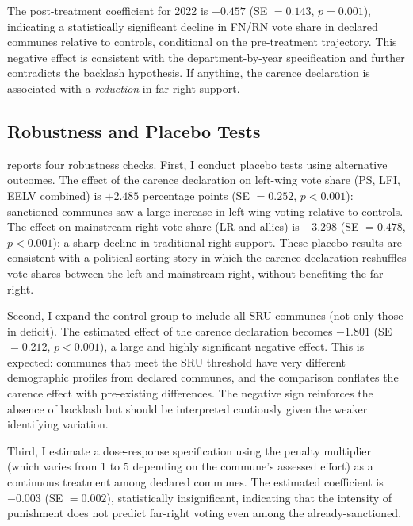 \documentclass[12pt]{article}
\begin{document}
The post-treatment coefficient for 2022 is $-0.457$ (SE $= 0.143$, $p = 0.001$), indicating a statistically significant decline in FN/RN vote share in declared communes relative to controls, conditional on the pre-treatment trajectory. This negative effect is consistent with the department-by-year specification and further contradicts the backlash hypothesis. If anything, the carence declaration is associated with a \textit{reduction} in far-right support.



\subsection{Robustness and Placebo Tests}

 reports four robustness checks. First, I conduct placebo tests using alternative outcomes. The effect of the carence declaration on left-wing vote share (PS, LFI, EELV combined) is $+2.485$ percentage points (SE $= 0.252$, $p < 0.001$): sanctioned communes saw a large increase in left-wing voting relative to controls. The effect on mainstream-right vote share (LR and allies) is $-3.298$ (SE $= 0.478$, $p < 0.001$): a sharp decline in traditional right support. These placebo results are consistent with a political sorting story in which the carence declaration reshuffles vote shares between the left and mainstream right, without benefiting the far right.

Second, I expand the control group to include all SRU communes (not only those in deficit). The estimated effect of the carence declaration becomes $-1.801$ (SE $= 0.212$, $p < 0.001$), a large and highly significant negative effect. This is expected: communes that meet the SRU threshold have very different demographic profiles from declared communes, and the comparison conflates the carence effect with pre-existing differences. The negative sign reinforces the absence of backlash but should be interpreted cautiously given the weaker identifying variation.

Third, I estimate a dose-response specification using the penalty multiplier (which varies from 1 to 5 depending on the commune's assessed effort) as a continuous treatment among declared communes. The estimated coefficient is $-0.003$ (SE $= 0.002$), statistically insignificant, indicating that the intensity of punishment does not predict far-right voting even among the already-sanctioned.


\end{document}
